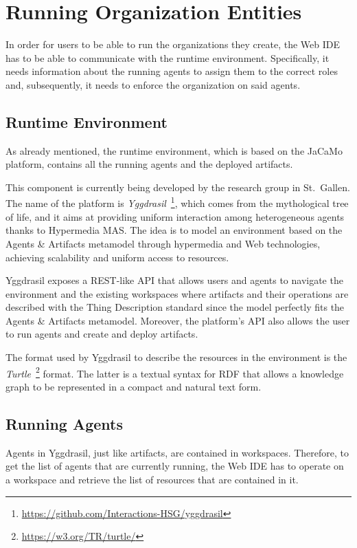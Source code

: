 \section{Running Organization Entities}
In order for users to be able to run the organizations they create, the Web IDE has to be able to communicate with the runtime environment.
Specifically, it needs information about the running agents to assign them to the correct roles and, subsequently, it needs to enforce the organization on said agents.

\subsection{Runtime Environment}
As already mentioned, the runtime environment, which is based on the JaCaMo platform, contains all the running agents and the deployed artifacts.

This component is currently being developed by the research group in St.\ Gallen.
The name of the platform is \textit{Yggdrasil}~\footnote{\url{https://github.com/Interactions-HSG/yggdrasil}}, which comes from the mythological tree of life, and it aims at providing uniform interaction among heterogeneous agents thanks to Hypermedia MAS.
The idea is to model an environment based on the Agents \& Artifacts metamodel through hypermedia and Web technologies, achieving scalability and uniform access to resources.

Yggdrasil exposes a REST-like API that allows users and agents to navigate the environment and the existing workspaces where artifacts and their operations are described with the Thing Description standard since the model perfectly fits the Agents \& Artifacts metamodel.
Moreover, the platform's API also allows the user to run agents and create and deploy artifacts.

The format used by Yggdrasil to describe the resources in the environment is the \textit{Turtle}~\footnote{\url{https://w3.org/TR/turtle/}} format.
The latter is a textual syntax for RDF that allows a knowledge graph to be represented in a compact and natural text form.

\subsection{Running Agents}
Agents in Yggdrasil, just like artifacts, are contained in workspaces.
Therefore, to get the list of agents that are currently running, the Web IDE has to operate on a workspace and retrieve the list of resources that are contained in it.

